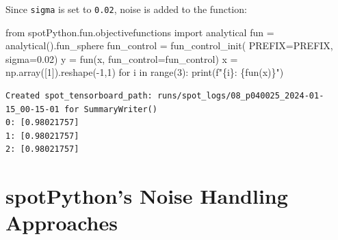 \documentclass[
  letterpaper,
  DIV=11,
  numbers=noendperiod]{scrreprt}
\newenvironment{Shaded}{\begin{snugshade}}{\end{snugshade}}
\newcommand{\BuiltInTok}[1]{\textcolor[rgb]{0.00,0.23,0.31}{#1}}
\newcommand{\ControlFlowTok}[1]{\textcolor[rgb]{0.00,0.23,0.31}{#1}}
\newcommand{\DecValTok}[1]{\textcolor[rgb]{0.68,0.00,0.00}{#1}}
\newcommand{\FloatTok}[1]{\textcolor[rgb]{0.68,0.00,0.00}{#1}}
\newcommand{\ImportTok}[1]{\textcolor[rgb]{0.00,0.46,0.62}{#1}}
\newcommand{\KeywordTok}[1]{\textcolor[rgb]{0.00,0.23,0.31}{#1}}
\newcommand{\NormalTok}[1]{\textcolor[rgb]{0.00,0.23,0.31}{#1}}
\newcommand{\OperatorTok}[1]{\textcolor[rgb]{0.37,0.37,0.37}{#1}}
\newcommand{\SpecialCharTok}[1]{\textcolor[rgb]{0.37,0.37,0.37}{#1}}
\newcommand{\SpecialStringTok}[1]{\textcolor[rgb]{0.13,0.47,0.30}{#1}}
\begin{document}
\begin{tcolorbox}[enhanced jigsaw, rightrule=.15mm, coltitle=black, title=\textcolor{quarto-callout-note-color}{\faInfo}\hspace{0.5em}{Example: The same noise added to the sphere function}, opacitybacktitle=0.6, bottomrule=.15mm, opacityback=0, left=2mm, colback=white, leftrule=.75mm, colframe=quarto-callout-note-color-frame, colbacktitle=quarto-callout-note-color!10!white, toprule=.15mm, toptitle=1mm, bottomtitle=1mm, titlerule=0mm, breakable, arc=.35mm]

Since \texttt{sigma} is set to \texttt{0.02}, noise is added to the
function:

\begin{Shaded}
\begin{Highlighting}[]
\ImportTok{from}\NormalTok{ spotPython.fun.objectivefunctions }\ImportTok{import}\NormalTok{ analytical}
\NormalTok{fun }\OperatorTok{=}\NormalTok{ analytical().fun\_sphere}
\NormalTok{fun\_control }\OperatorTok{=}\NormalTok{ fun\_control\_init(}
\NormalTok{    PREFIX}\OperatorTok{=}\NormalTok{PREFIX,}
\NormalTok{    sigma}\OperatorTok{=}\FloatTok{0.02}\NormalTok{)}
\NormalTok{y }\OperatorTok{=}\NormalTok{ fun(x, fun\_control}\OperatorTok{=}\NormalTok{fun\_control)}
\NormalTok{x }\OperatorTok{=}\NormalTok{ np.array([}\DecValTok{1}\NormalTok{]).reshape(}\OperatorTok{{-}}\DecValTok{1}\NormalTok{,}\DecValTok{1}\NormalTok{)}
\ControlFlowTok{for}\NormalTok{ i }\KeywordTok{in} \BuiltInTok{range}\NormalTok{(}\DecValTok{3}\NormalTok{):}
    \BuiltInTok{print}\NormalTok{(}\SpecialStringTok{f"}\SpecialCharTok{\{}\NormalTok{i}\SpecialCharTok{\}}\SpecialStringTok{: }\SpecialCharTok{\{}\NormalTok{fun(x)}\SpecialCharTok{\}}\SpecialStringTok{"}\NormalTok{)}
\end{Highlighting}
\end{Shaded}

\begin{verbatim}
Created spot_tensorboard_path: runs/spot_logs/08_p040025_2024-01-15_00-15-01 for SummaryWriter()
0: [0.98021757]
1: [0.98021757]
2: [0.98021757]
\end{verbatim}

\end{tcolorbox}

\section{spotPython's Noise Handling
Approaches}\label{spotpythons-noise-handling-approaches}
\end{document}
